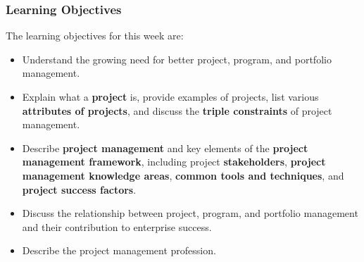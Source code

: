 \documentclass[aspectratio=169]{beamer}
\begin{document}
\begin{frame}
\frametitle{Learning Objectives}
The learning objectives for this week are:\\

\begin{itemize}
\item Understand the growing need for better project, program, and portfolio management.
\item Explain what a \textbf{project} is, provide examples of projects, list various \textbf{attributes of projects}, and discuss the \textbf{triple constraints} of project management.
\item Describe \textbf{project management} and key elements of the \textbf{project management framework}, including project \textbf{stakeholders}, \textbf{project management knowledge areas}, \textbf{common tools and techniques}, and \textbf{project success factors}.
\item Discuss the relationship between project, program, and portfolio management and their contribution to enterprise success.
\item Describe the project management profession.
\end{itemize}
\end{frame}
\end{document}
